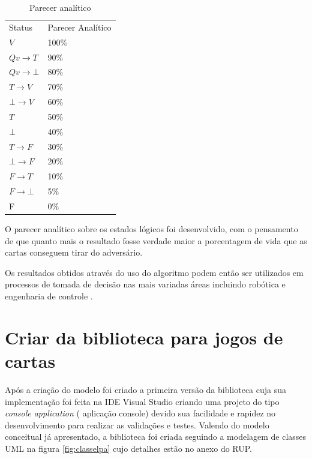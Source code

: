 \begin{table}[htb]
	\centering
	\caption{Parecer analítico}
	\label{tab:analitico}
	\begin{tabular}{ll}
		Status             		& Parecer Analítico \\
		$V$                  	& 100\%               \\
		$Qv \rightarrow T$ 		& 90\%                \\
		$Qv \rightarrow \bot$ 	& 80\%                \\
		$T \rightarrow V$    	& 70\%                \\
		$\bot \rightarrow V$  	& 60\%                \\
		$T$                 	& 50\%                \\
		$\bot$                 	& 40\%                \\
		$T \rightarrow F$  		& 30\%                \\
		$\bot \rightarrow F$   	& 20\%                \\
		$F \rightarrow T$  		& 10\%                \\
		$F \rightarrow \bot$  	& 5\%                 \\
		F                    	& 0\%                
	\end{tabular}
\end{table}

O parecer analítico sobre os estados lógicos foi desenvolvido, com o pensamento de que quanto mais o resultado fosse verdade maior a porcentagem de vida que as cartas conseguem tirar do adversário.

Os resultados obtidos através do uso do algoritmo podem então ser utilizados em processos de tomada de decisão nas mais variadas áreas incluindo robótica e engenharia de controle \cite{aspectos-lpa-2013}.

\section{Criar da biblioteca para jogos de cartas}

Após a criação do modelo foi criado a primeira versão da biblioteca cuja sua  implementação foi feita na IDE Visual Studio criando uma projeto do tipo \textit{console application} ( aplicação console) devido sua facilidade e rapidez no desenvolvimento para realizar as validações e testes. Valendo do modelo conceitual já apresentado, a biblioteca foi criada seguindo a modelagem de classes UML na figura \ref{fig:classelpa} cujo detalhes estão no anexo do RUP.

